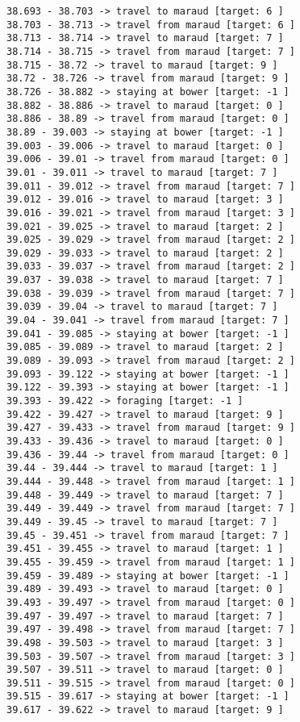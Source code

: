 \documentclass[11pt]{article}
\begin{document}
\begin{Verbatim}[commandchars=\\\{\}]
38.693 - 38.703 -> travel to maraud [target: 6 ]
38.703 - 38.713 -> travel from maraud [target: 6 ]
38.713 - 38.714 -> travel to maraud [target: 7 ]
38.714 - 38.715 -> travel from maraud [target: 7 ]
38.715 - 38.72 -> travel to maraud [target: 9 ]
38.72 - 38.726 -> travel from maraud [target: 9 ]
38.726 - 38.882 -> staying at bower [target: -1 ]
38.882 - 38.886 -> travel to maraud [target: 0 ]
38.886 - 38.89 -> travel from maraud [target: 0 ]
38.89 - 39.003 -> staying at bower [target: -1 ]
39.003 - 39.006 -> travel to maraud [target: 0 ]
39.006 - 39.01 -> travel from maraud [target: 0 ]
39.01 - 39.011 -> travel to maraud [target: 7 ]
39.011 - 39.012 -> travel from maraud [target: 7 ]
39.012 - 39.016 -> travel to maraud [target: 3 ]
39.016 - 39.021 -> travel from maraud [target: 3 ]
39.021 - 39.025 -> travel to maraud [target: 2 ]
39.025 - 39.029 -> travel from maraud [target: 2 ]
39.029 - 39.033 -> travel to maraud [target: 2 ]
39.033 - 39.037 -> travel from maraud [target: 2 ]
39.037 - 39.038 -> travel to maraud [target: 7 ]
39.038 - 39.039 -> travel from maraud [target: 7 ]
39.039 - 39.04 -> travel to maraud [target: 7 ]
39.04 - 39.041 -> travel from maraud [target: 7 ]
39.041 - 39.085 -> staying at bower [target: -1 ]
39.085 - 39.089 -> travel to maraud [target: 2 ]
39.089 - 39.093 -> travel from maraud [target: 2 ]
39.093 - 39.122 -> staying at bower [target: -1 ]
39.122 - 39.393 -> staying at bower [target: -1 ]
39.393 - 39.422 -> foraging [target: -1 ]
39.422 - 39.427 -> travel to maraud [target: 9 ]
39.427 - 39.433 -> travel from maraud [target: 9 ]
39.433 - 39.436 -> travel to maraud [target: 0 ]
39.436 - 39.44 -> travel from maraud [target: 0 ]
39.44 - 39.444 -> travel to maraud [target: 1 ]
39.444 - 39.448 -> travel from maraud [target: 1 ]
39.448 - 39.449 -> travel to maraud [target: 7 ]
39.449 - 39.449 -> travel from maraud [target: 7 ]
39.449 - 39.45 -> travel to maraud [target: 7 ]
39.45 - 39.451 -> travel from maraud [target: 7 ]
39.451 - 39.455 -> travel to maraud [target: 1 ]
39.455 - 39.459 -> travel from maraud [target: 1 ]
39.459 - 39.489 -> staying at bower [target: -1 ]
39.489 - 39.493 -> travel to maraud [target: 0 ]
39.493 - 39.497 -> travel from maraud [target: 0 ]
39.497 - 39.497 -> travel to maraud [target: 7 ]
39.497 - 39.498 -> travel from maraud [target: 7 ]
39.498 - 39.503 -> travel to maraud [target: 3 ]
39.503 - 39.507 -> travel from maraud [target: 3 ]
39.507 - 39.511 -> travel to maraud [target: 0 ]
39.511 - 39.515 -> travel from maraud [target: 0 ]
39.515 - 39.617 -> staying at bower [target: -1 ]
39.617 - 39.622 -> travel to maraud [target: 9 ]

\end{Verbatim}
\end{document}
